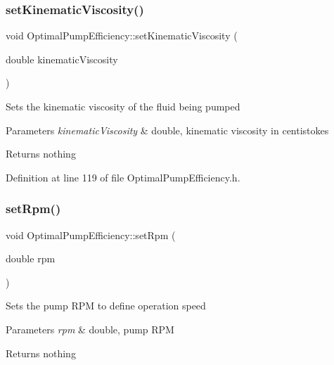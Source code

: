 \subsubsection{\texorpdfstring{set\+Kinematic\+Viscosity()}{setKinematicViscosity()}\hspace{0.1cm}{\footnotesize\ttfamily [3/3]}}
{\footnotesize\ttfamily void Optimal\+Pump\+Efficiency\+::set\+Kinematic\+Viscosity (\begin{DoxyParamCaption}\item[{double}]{kinematic\+Viscosity }\end{DoxyParamCaption})\hspace{0.3cm}{\ttfamily [inline]}}

Sets the kinematic viscosity of the fluid being pumped


\begin{DoxyParams}{Parameters}
{\em kinematic\+Viscosity} & double, kinematic viscosity in centistokes\\
\hline
\end{DoxyParams}
\begin{DoxyReturn}{Returns}
nothing 
\end{DoxyReturn}


Definition at line 119 of file Optimal\+Pump\+Efficiency.\+h.

\mbox{\label{class_optimal_pump_efficiency_afc6b6f46b4e289efc8819249ad1c9fb5}} 
\subsubsection{\texorpdfstring{set\+Rpm()}{setRpm()}\hspace{0.1cm}{\footnotesize\ttfamily [1/3]}}
{\footnotesize\ttfamily void Optimal\+Pump\+Efficiency\+::set\+Rpm (\begin{DoxyParamCaption}\item[{double}]{rpm }\end{DoxyParamCaption})\hspace{0.3cm}{\ttfamily [inline]}}

Sets the pump R\+PM to define operation speed


\begin{DoxyParams}{Parameters}
{\em rpm} & double, pump R\+PM\\
\hline
\end{DoxyParams}
\begin{DoxyReturn}{Returns}
nothing 
\end{DoxyReturn}


